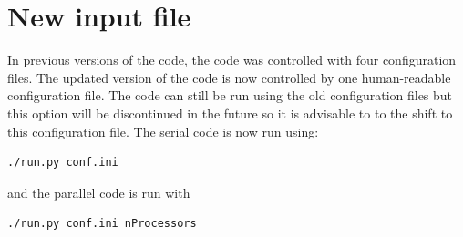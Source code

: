 \documentclass[12pt]{article}
\begin{document}
\section{New input file}
In previous versions of the code, the code was controlled with four configuration files. The updated
version of the code is now controlled by one human-readable configuration file. The code can still be
run using the old configuration files but this option will be discontinued in the future so it is 
advisable to to the shift to this configuration file. The serial code is now run using:
\begin{verbatim}
./run.py conf.ini
\end{verbatim}
and the parallel code is run with
\begin{verbatim}
./run.py conf.ini nProcessors
\end{verbatim}
\end{document}
